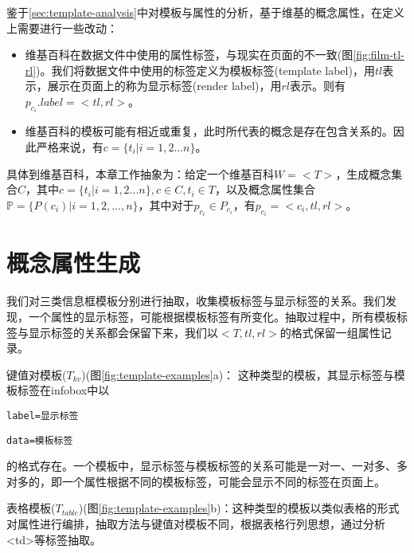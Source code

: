鉴于\ref{sec:template-analysis}中对模板与属性的分析，基于维基的概念属性，在定义上需要进行一些改动：
\begin{itemize}
\item 维基百科在数据文件中使用的属性标签，与现实在页面的不一致(图\ref{fig:film-tl-rl})。我们将数据文件中使用的标签定义为模板标签(template label)，用$tl$表示，展示在页面上的称为显示标签(render label)，用$rl$表示。则有$p_{c_i}.label = <tl, rl>$。
\item 维基百科的模板可能有相近或重复，此时所代表的概念是存在包含关系的。因此严格来说，有$c = \{t_i|i=1,2...n\}$。
\end{itemize}

具体到维基百科，本章工作抽象为：给定一个维基百科$W = <T>$，生成概念集合$C$，其中$c = \{t_i|i=1,2...n\}, c \in C, t_i \in T$，以及概念属性集合$\mathbb{P} = \{P(c_i)| i = 1,2,...,n\}$，其中对于$p_{c_i} \in P_{c_i}$，有$p_{c_i} = <c_i, tl, rl>$。

\section{概念属性生成}
\label{sec:property-extraction}

我们对三类信息框模板分别进行抽取，收集模板标签与显示标签的关系。我们发现，一个属性的显示标签，可能根据模板标签有所变化。抽取过程中，所有模板标签与显示标签的关系都会保留下来，我们以$<T, tl, rl>$的格式保留一组属性记录。

{\heiti 键值对模板($T_{kv}$)(图\ref{fig:template-examples}a)：} 这种类型的模板，其显示标签与模板标签在infobox中以
\begin{center}
\verb"label=显示标签"

\verb"data=模板标签"
\end{center}
的格式存在。一个模板中，显示标签与模板标签的关系可能是一对一、一对多、多对多的，即一个属性根据不同的模板标签，可能会显示不同的标签在页面上。

{\heiti 表格模板($T_{table}$)(图\ref{fig:template-examples}b)：}这种类型的模板以类似表格的形式对属性进行编排，抽取方法与键值对模板不同，根据表格行列思想，通过分析<td>等标签抽取。

